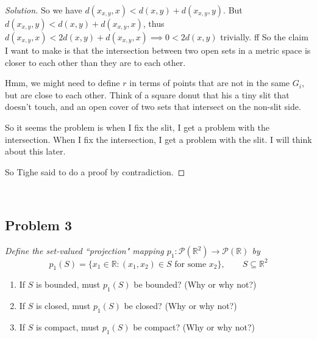 \documentclass{article}
\newcommand{\R}{{\mathbb R}}
\begin{document}
\begin{proof}[Solution]
	So we have $d(x_{x,y}, x) < d(x,y) + d(x_{x,y},y)$.
	But $d(x_{x,y},y) < d(x,y) + d(x_{x,y},x)$, thus
	$d(x_{x,y}, x) < 2d(x,y) + d(x_{x,y},x) \implies 0 < 2d(x,y)$ trivially.
	ff
	So the claim I want to make is that the intersection between
	two open sets in a metric space is closer to each other than
	they are to each other.


	Hmm, we might need to define $r$ in terms of points that are
	not in the same $G_i$, but are close to each other.
	Think of a square donut that his a tiny slit that doesn't touch,
	and an open cover of two sets that intersect on the non-slit side.

	So it seems the problem is when I fix the slit,
	I get a problem with the intersection.
	When I fix the intersection, I get a problem with the slit.
	I will think about this later.


	So Tighe said to do a proof by contradiction.
\end{proof}
\clearpage
~\clearpage

\subsection*{Problem 3}
{\it Define the set-valued ``projection" mapping
$p_1 \colon \mathcal{P}(\R^2) \to \mathcal{P}(\R)$ by
\[
	p_1(S) = \{x_1 \in \R \colon (x_1,x_2) \in S \text{ for some }x_2\},
	\qquad S \subseteq \R^2
\]
\begin{enumerate}
	\item If $S$ is bounded, must $p_1(S)$ be bounded? (Why or why not?)
	\item If $S$ is closed, must $p_1(S)$ be closed? (Why or why not?)
	\item If $S$ is compact, must $p_1(S)$ be compact? (Why or why not?)
\end{enumerate}}
\end{document}
